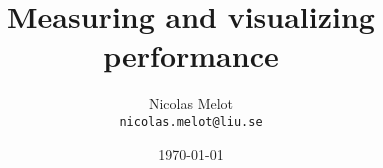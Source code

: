 \documentclass{article}
\begin{document}
\title{Measuring and visualizing performance\\}
\author{Nicolas Melot \\
\texttt{nicolas.melot@liu.se}
}
\date{\today}

\graphicspath{{tmp/}}

\maketitle



\cleardoublepage
{}

\end{document}
